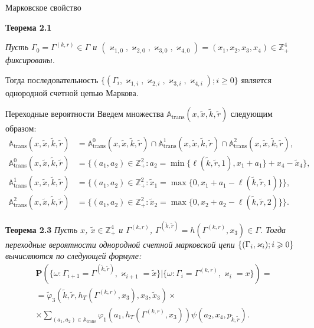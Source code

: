 \documentclass[10pt]{beamer}
\newcommand{\Mark}{\{(\Gamma_i, \varkappa_i); \hm{} i \geqslant 0\}}
\newcommand*{\hm}[1]{#1\nobreak\discretionary{}%
	{\hbox{$\mathsurround=0pt #1$}}{}}%
\renewcommand{\Pr}{{\mathbf P}}
\begin{document}
\begin{frame}{Марковское свойство}
\begin{block}
    {\bf Теорема 2.1} {\it 
Пусть $\Gamma_0=\Gamma^{(k,r)}\in \Gamma$ и $(\varkappa_{1,0},\varkappa_{2,0},\varkappa_{3,0},\varkappa_{4,0})=(x_1,x_2,x_3,x_4)\in \mathbb{Z}_+^4$ фиксированы. 

Тогда последовательность $\{(\Gamma_i, \varkappa_{1,i},\varkappa_{2,i}, \varkappa_{3,i}, \varkappa_{4,i}); i \geqslant 0\}$ является однородной счетной цепью Маркова.
}
\end{block}
\end{frame}


\begin{frame}[allowframebreaks]{Переходные вероятности}
Введем множества ${\mathbb A}_{\mathrm{trans}}(x,\tilde{x},\tilde{k},\tilde{r})$  следующим образом:
\begin{align}
{\mathbb A}_{\mathrm{trans}}(x,\tilde{x},\tilde{k},\tilde{r}) &= {\mathbb A}_{\mathrm{trans}}^0(x,\tilde{x},\tilde{k},\tilde{r}) \cap {\mathbb A}_{\mathrm{trans}}^1(x,\tilde{x},\tilde{k},\tilde{r})\cap {\mathbb A}_{\mathrm{trans}}^2(x,\tilde{x},\tilde{k},\tilde{r}),\label{A:trans:1}\\
{\mathbb A}_{\mathrm{trans}}^0(x,\tilde{x},\tilde{k},\tilde{r}) &= \{(a_1,a_2) \in \mathbb{Z}_+^2 \colon a_2 = \min{\{\ell(\tilde{k},\tilde{r},1), x_1+a_1}\} +x_4-\tilde{x}_4\},\\
{\mathbb A}_{\mathrm{trans}}^1(x,\tilde{x},\tilde{k},\tilde{r}) &= \{(a_1,a_2) \in \mathbb{Z}_+^2 \colon \tilde{x}_1=\max{\{0,x_1+a_1-\ell(\tilde{k},\tilde{r},1)\}}\},\\
{\mathbb A}_{\mathrm{trans}}^2(x,\tilde{x},\tilde{k},\tilde{r}) &= \{(a_1,a_2) \in \mathbb{Z}_+^2 \colon  \tilde{x}_2=\max{\{0,x_2+a_2-\ell(\tilde{k},\tilde{r},2)\}}\}.\label{A:trans:2}
\end{align}
\framebreak 

 {\bf Теорема 2.3}
{\it 
Пусть $x$, $\tilde{x}\in \mathbb{Z}_+^4$ и $\Gamma^{(k,r)}$, $\Gamma^{(\tilde{k},\tilde{r})}=h(\Gamma^{(k,r)},x_3) \in \Gamma$. Тогда переходные вероятности однородной счетной марковской цепи $\Mark$ вычисляются по следующей формуле:
\begin{multline}
\Pr (\{\omega\colon \Gamma_{i+1}=\Gamma^{(\tilde{k},\tilde{r})},\varkappa_{i+1}=\tilde{x} \}| \{\omega\colon \Gamma_{i}=\Gamma^{(k,r)},\varkappa_i=x\})=\\ 
=\widetilde{\varphi}_3(\tilde{k},\tilde{r},h_T(\Gamma^{(k,r)},x_3),x_3,\tilde{x}_3)\times \\ \times
\sum_{(a_1,a_2)\in {\mathbb A}_{\mathrm{trans}}}\varphi_1(a_1,h_T(\Gamma^{(k,r)},x_3))  \psi(a_2,x_4, p_{\tilde{k},\tilde{r}}).
\label{transitionToProve}
\end{multline}
}

\end{frame}
\end{document}
